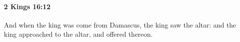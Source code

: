 
		\paragraph{2 Kings 16:12} %
			\label{2KINGS-16-12}

			And when the king was come from Damascus, the king saw the altar: and the king approached to the altar, and offered thereon.


